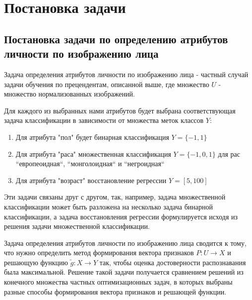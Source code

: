 \documentclass[12pt,a4paper]{article}
\begin{document}
\section{Постановка задачи}
\subsection{Постановка задачи по определению атрибутов личности по изображению лица}
Задача определения атрибутов личности по изображению лица - частный случай задачи обучения по прецендентам, описанной выше, где множество $U$ - множество нормализованных изображений.

Для каждого из выбранных нами атрибутов будет выбрана соответствующая задача классификации в зависимости от множества меток классов $Y$:
\begin{enumerate}
    \item Для атрибута "пол" будет бинарная классификация $Y = \{-1 , 1\}$
    \item Для атрибута "раса" множественная классификация $Y = \{-1, 0, 1\}$ для рас ``европеоидная``, ``монголоидная`` и ``негроидная``
    \item Для атрибута "возраст" восстановление регрессии $Y = [5, 100]$
\end{enumerate}

Эти задачи связаны друг с другом, так, например, задача множественной классификации может быть разложена на несколько задача бинарной классификации, а задача восстановления регрессии формулируется исходя из решения задачи множественной классификации.

Задача определения атрибутов личности по изображению лица сводится к тому, что нужно определить метод формирования вектора признаков $P: U \longrightarrow X$ и решающую функцию $\tilde{g}: X \longrightarrow Y$ так, чтобы оценка достоверности распознавания была максимальной. Решение такой задачи получается сравнением решений из конечного множества частных оптимизационных задач, в которых выбраны разные способы формирования вектора признаков и решающей функции.
\end{document}
